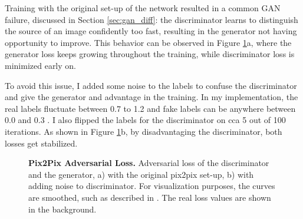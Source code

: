 \documentclass[12pt]{report}
\begin{document}
\pagebreak
Training with the original set-up of the network resulted in a common GAN failure, discussed in Section \ref{sec:gan_diff}: the discriminator learns to distinguish the source of an image confidently too fast, resulting in the generator not having opportunity to improve. This behavior can be observed in Figure \ref{fig:pix2pix_losses}a, where the generator loss keeps growing throughout the training, while discriminator loss is minimized early on.

To avoid this issue, I added some noise to the labels to confuse the discriminator and give the generator and advantage in the training. In my implementation, the real labels fluctuate between 0.7 to 1.2 and fake labels can be anywhere between 0.0 and 0.3 \cite{chintala_starter_2018}. I also flipped the labels for the discriminator on cca 5 out of 100 iterations. As shown in Figure \ref{fig:pix2pix_losses}b, by disadvantaging the discriminator, both losses get stabilized.

\begin{figure}[t]
\centering
{}
\caption{\label{fig:pix2pix_losses} \textbf{Pix2Pix Adversarial Loss.} Adversarial loss of the discriminator and the generator, a) with the original pix2pix set-up, b) with adding noise to discriminator. For visualization purposes, the curves are smoothed, such as described in \cite{noauthor_tensorflows_2018}. The real loss values are shown in the background.}
\end{figure}
\end{document}
